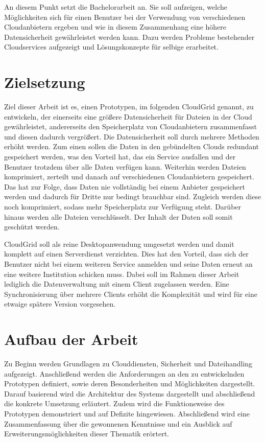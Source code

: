 An diesem Punkt setzt die Bachelorarbeit an.
Sie soll aufzeigen, welche Möglichkeiten sich für einen Benutzer bei der Verwendung von verschiedenen Cloudanbietern ergeben und wie in diesem Zusammenhang eine höhere Datensicherheit gewährleistet werden kann.
Dazu werden Probleme bestehender Cloudservices aufgezeigt und Lösungskonzepte für selbige erarbeitet.

\section{Zielsetzung}
\label{zielsetzung}
Ziel dieser Arbeit ist es, einen Prototypen, im folgenden CloudGrid genannt, zu entwickeln, der einerseits eine größere Datensicherheit für Dateien in der Cloud gewährleistet, andererseits den Speicherplatz von Cloudanbietern zusammenfasst und diesen dadurch vergrößert.
Die Datensicherheit soll durch mehrere Methoden erhöht werden.
Zum einen sollen die Daten in den gebündelten Clouds redundant gespeichert werden, was den Vorteil hat, das ein Service ausfallen und der Benutzer trotzdem über alle Daten verfügen kann.
Weiterhin werden Dateien komprimiert, zerteilt und danach auf verschiedenen Cloudanbietern gespeichert.
Das hat zur Folge, dass Daten nie vollständig bei einem Anbieter gespeichert werden und dadurch für Dritte nur bedingt brauchbar sind.
Zugleich werden diese noch komprimiert, sodass mehr Speicherplatz zur Verfügung steht.
Darüber hinaus werden alle Dateien verschlüsselt.
Der Inhalt der Daten soll somit geschützt werden.

CloudGrid soll als reine Desktopanwendung umgesetzt werden und damit komplett auf einen Serverdienst verzichten.
Dies hat den Vorteil, dass sich der Benutzer nicht bei einem weiteren Service anmelden und seine Daten erneut an eine weitere Institution schicken muss.
Dabei soll im Rahmen dieser Arbeit lediglich die Datenverwaltung mit einem Client zugelassen werden.
Eine Synchronisierung über mehrere Clients erhöht die Komplexität und wird für eine etwaige spätere Version vorgesehen.

\section{Aufbau der Arbeit}
\label{aufbau}
Zu Beginn werden Grundlagen zu Clouddiensten, Sicherheit und Dateihandling aufgezeigt.
Anschließend werden die Anforderungen an den zu entwickelnden Prototypen definiert, sowie deren Besonderheiten und Möglichkeiten dargestellt.
Darauf basierend wird die Architektur des Systems dargestellt und abschließend die konkrete Umsetzung erläutert.
Zudem wird die Funktionsweise des Prototypen demonstriert und auf Defizite hingewiesen.
Abschließend wird eine Zusammenfassung über die gewonnenen Kenntnisse und ein Ausblick auf Erweiterungsmöglichkeiten dieser Thematik 
erörtert.